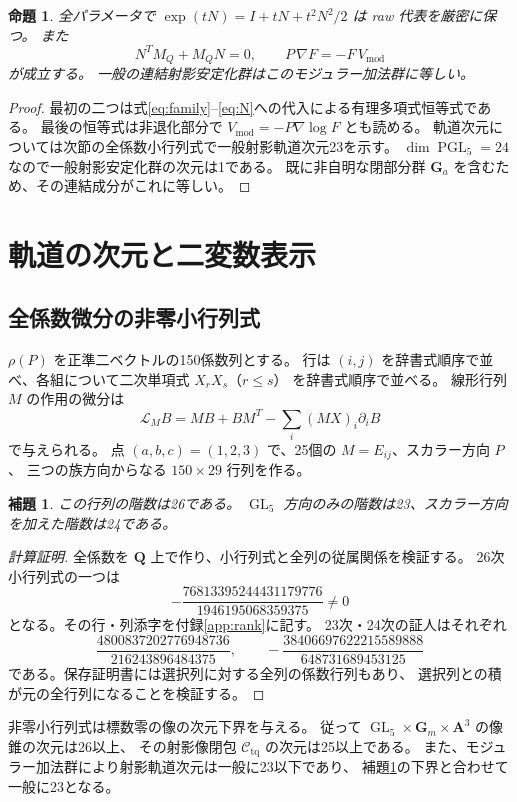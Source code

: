 \documentclass[11pt,a4paper]{ltjsarticle}
\newcommand{\QQ}{\mathbf Q}
\renewcommand{\AA}{\mathbf A}
\newcommand{\GG}{\mathbf G}
\newcommand{\cC}{\mathcal C_{\mathrm{tq}}}
\DeclareMathOperator{\GL}{GL}
\DeclareMathOperator{\PGL}{PGL}
\newtheorem{proposition}[theorem]{命題}
\newtheorem{lemma}[theorem]{補題}
\theoremstyle{remark}
\begin{document}
\begin{proposition}\label{prop:Ga}
全パラメータで $\exp(tN)=I+tN+t^2N^2/2$ は raw 代表を厳密に保つ。
また
\[
 N^TM_Q+M_QN=0,\qquad
 P\,\nabla F=-F\,V_{\mathrm{mod}}
\]
が成立する。
一般の連結射影安定化群はこのモジュラー加法群に等しい。
\end{proposition}
\begin{proof}
最初の二つは式\eqref{eq:family}--\eqref{eq:N}への代入による有理多項式恒等式である。
最後の恒等式は非退化部分で $V_{\mathrm{mod}}=-P\nabla\log F$ とも読める。
軌道次元については次節の全係数小行列式で一般射影軌道次元23を示す。
$\dim\PGL_5=24$ なので一般射影安定化群の次元は1である。
既に非自明な閉部分群 $\GG_a$ を含むため、その連結成分がこれに等しい。
\end{proof}

\section{軌道の次元と二変数表示}

\subsection{全係数微分の非零小行列式}

$\rho(P)$ を正準二ベクトルの150係数列とする。
行は $(i,j)$ を辞書式順序で並べ、各組について二次単項式 $X_rX_s$（$r\le s$）
を辞書式順序で並べる。
線形行列 $M$ の作用の微分は
\[
 \mathcal L_M B=MB+BM^T-\sum_i(MX)_i\partial_iB
\]
で与えられる。
点 $(a,b,c)=(1,2,3)$ で、25個の $M=E_{ij}$、スカラー方向 $P$、
三つの族方向からなる $150\times29$ 行列を作る。
\begin{lemma}\label{lem:rank}
この行列の階数は26である。
$\GL_5$ 方向のみの階数は23、スカラー方向を加えた階数は24である。
\end{lemma}
\begin{proof}[計算証明]
全係数を $\QQ$ 上で作り、小行列式と全列の従属関係を検証する。
26次小行列式の一つは
\[
 -\frac{76813395244431179776}{1946195068359375}\ne0
\]
となる。その行・列添字を付録\ref{app:rank}に記す。
23次・24次の証人はそれぞれ
\[
 \frac{4800837202776948736}{216243896484375},\qquad
 -\frac{38406697622215589888}{648731689453125}
\]
である。保存証明書には選択列に対する全列の係数行列もあり、
選択列との積が元の全行列になることを検証する。
\end{proof}

非零小行列式は標数零の像の次元下界を与える。
従って $\GL_5\times\GG_m\times\AA^3$ の像錐の次元は26以上、
その射影像閉包 $\cC$ の次元は25以上である。
また、モジュラー加法群により射影軌道次元は一般に23以下であり、
補題\ref{lem:rank}の下界と合わせて一般に23となる。
\end{document}
